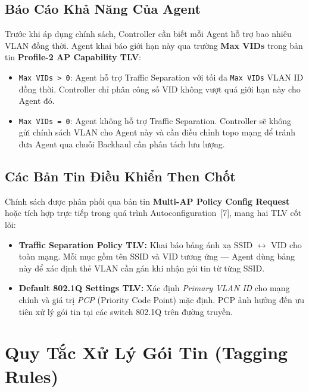 \subsection{Báo Cáo Khả Năng Của Agent}

Trước khi áp dụng chính sách, Controller cần biết mỗi Agent hỗ trợ bao nhiêu VLAN
đồng thời. Agent khai báo giới hạn này qua trường \textbf{Max VIDs} trong bản tin
\textbf{Profile-2 AP Capability TLV}:

\begin{itemize}
	\item \texttt{Max VIDs > 0}: Agent hỗ trợ Traffic Separation với tối đa \texttt{Max
		VIDs} VLAN ID đồng thời. Controller chỉ phân công số VID không vượt quá giới
	hạn này cho Agent đó.
	\item \texttt{Max VIDs = 0}: Agent không hỗ trợ Traffic Separation. Controller sẽ
	không gửi chính sách VLAN cho Agent này và cần điều chỉnh topo mạng để tránh
	đưa Agent qua chuỗi Backhaul cần phân tách lưu lượng.
\end{itemize}


\subsection{Các Bản Tin Điều Khiển Then Chốt}

Chính sách được phân phối qua bản tin \textbf{Multi-AP Policy Config Request} hoặc
tích hợp trực tiếp trong quá trình Autoconfiguration~[7], mang hai TLV cốt lõi:

\begin{itemize}
	\item \textbf{Traffic Separation Policy TLV:} Khai báo bảng ánh xạ SSID
	$\leftrightarrow$ VID cho toàn mạng. Mỗi mục gồm tên SSID và VID tương ứng
	--- Agent dùng bảng này để xác định thẻ VLAN cần gán khi nhận gói tin từ
	từng SSID.
	\item \textbf{Default 802.1Q Settings TLV:} Xác định \textit{Primary VLAN ID} cho
	mạng chính và giá trị \textit{PCP} (Priority Code Point) mặc định. PCP ảnh
	hưởng đến ưu tiên xử lý gói tin tại các switch 802.1Q trên đường truyền.
\end{itemize}


\section{Quy Tắc Xử Lý Gói Tin (Tagging Rules)}

